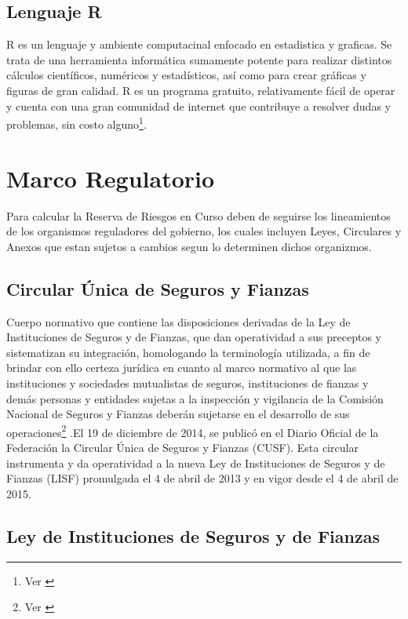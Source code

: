 \documentclass[11pt,twoside,openright,spanish]{report}
\numberwithin{equation}{chapter}
\numberwithin{figure}{chapter}
\numberwithin{table}{chapter}
\begin{document}
	
		\section{Lenguaje R}
	R es un lenguaje y ambiente computacinal enfocado en estadistica y graficas. Se trata de una herramienta informática sumamente potente para realizar distintos cálculos científicos, numéricos y estadísticos, así como para crear gráficas y figuras de gran calidad. R es un programa gratuito, relativamente fácil de operar y cuenta con una gran comunidad de internet que contribuye a resolver dudas y problemas, sin costo alguno\footnote{Ver \citet{KR}}.
	
	\chapter{Marco Regulatorio}\label{tcyedb}
	
	Para calcular la Reserva de Riesgos en Curso deben de seguirse los lineamientos de los organismos reguladores del gobierno, los cuales incluyen Leyes, Circulares y Anexos que estan sujetos a cambios segun lo determinen dichos organizmos.
	
	\section{Circular Única de Seguros y Fianzas}

	
	Cuerpo normativo que contiene las disposiciones derivadas de la Ley de Instituciones de Seguros y de Fianzas, que dan operatividad a sus preceptos y sistematizan su integración, homologando la terminología utilizada, a fin de brindar con ello certeza jurídica en cuanto al marco normativo al que las instituciones y sociedades mutualistas de seguros, instituciones de fianzas y demás personas y entidades sujetas a la inspección y vigilancia de la Comisión Nacional de Seguros y Fianzas deberán sujetarse en el desarrollo de sus operaciones\footnote{Ver \citet{IDefCusf}} .El 19 de diciembre de 2014, se publicó en el Diario Oficial de la Federación la Circular Única de Seguros y Fianzas (CUSF). Esta circular instrumenta y da operatividad a la nueva Ley de Instituciones de Seguros y de Fianzas (LISF) promulgada el 4 de abril de 2013 y en vigor desde el 4 de abril de 2015. 
	
	\section{Ley de Instituciones de Seguros y de Fianzas}
\end{document}
